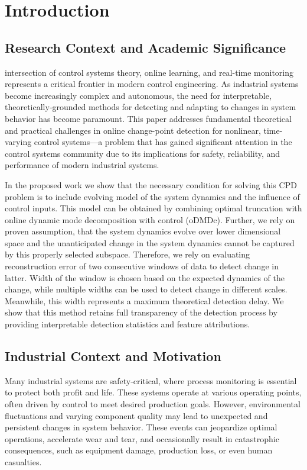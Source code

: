 \section{Introduction}\label{sec:introduction}

\subsection{Research Context and Academic Significance}
 intersection of control systems theory, online learning, and real-time monitoring represents a critical frontier in modern control engineering. As industrial systems become increasingly complex and autonomous, the need for interpretable, theoretically-grounded methods for detecting and adapting to changes in system behavior has become paramount. This paper addresses fundamental theoretical and practical challenges in online change-point detection for nonlinear, time-varying control systems—a problem that has gained significant attention in the control systems community due to its implications for safety, reliability, and performance of modern industrial systems.

In the proposed work we show that the necessary condition for solving this CPD problem is to include evolving model of the system dynamics and the influence of control inputs. This model can be obtained by combining optimal truncation with online dynamic mode decomposition with control (oDMDc). Further, we rely on proven assumption, that the system dynamics evolve over lower dimensional space and the unanticipated change in the system dynamics cannot be captured by this properly selected subspace. Therefore, we rely on evaluating reconstruction error of two consecutive windows of data to detect change in latter. Width of the window is chosen based on the expected dynamics of the change, while multiple widths can be used to detect change in different scales. Meanwhile, this width represents a maximum theoretical detection delay. We show that this method retains full transparency of the detection process by providing interpretable detection statistics and feature attributions.

\subsection{Industrial Context and Motivation}
Many industrial systems are safety-critical, where process monitoring is essential to protect both profit and life. These systems operate at various operating points, often driven by control to meet desired production goals. However, environmental fluctuations and varying component quality may lead to unexpected and persistent changes in system behavior. These events can jeopardize optimal operations, accelerate wear and tear, and occasionally result in catastrophic consequences, such as equipment damage, production loss, or even human casualties.

